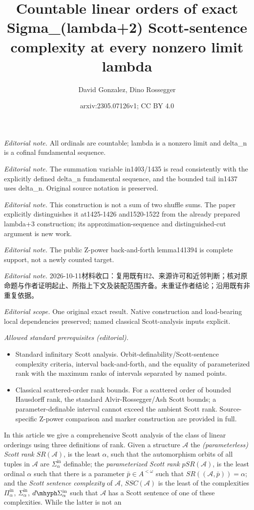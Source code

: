 \documentclass[10pt,a4paper]{amsart}
\title{Countable linear orders of exact Sigma\_(lambda+2) Scott-sentence complexity at every nonzero limit lambda}
\author{David Gonzalez, Dino Rossegger}
\date{arxiv:2305.07126v1; CC BY 4.0}
\providecommand{\A}{\mathcal{A}}
\providecommand{\Pinf}[1]{\Pi^{\mathrm{in}}_{#1}}
\providecommand{\Sinf}[1]{\Sigma^{\mathrm{in}}_{#1}}
\providecommand{\dSinf}[1]{d\mhyph\Sigma^{\mathrm{in}}_{#1}}
\providecommand{\bp}{\bar p}
\newcommand{\SR}{SR}
\newcommand{\pSR}{pSR}
\begin{document}
\maketitle
\noindent\textit{Editorial note.} All ordinals are countable; lambda is a nonzero limit and delta\_n is a cofinal fundamental sequence.\par\medskip
\noindent\textit{Editorial note.} The summation variable in1403/1435 is read consistently with the explicitly defined delta\_n fundamental sequence, and the bounded tail in1437 uses delta\_n. Original source notation is preserved.\par\medskip
\noindent\textit{Editorial note.} This construction is not a sum of two shuffle sums. The paper explicitly distinguishes it at1425-1426 and1520-1522 from the already prepared lambda+3 construction; its approximation-sequence and distinguished-cut argument is new work.\par\medskip
\noindent\textit{Editorial note.} The public Z-power back-and-forth lemma141394 is complete support, not a newly counted target.\par\medskip
\noindent\textit{Editorial note.} 2026-10-11材料收口：复用既有H2、来源许可和近邻判断；核对原命题与作者证明起止、所指上下文及装配范围齐备。未重证作者结论；沿用既有非重复依据。\par\medskip
\noindent\textit{Editorial scope.} One original exact result. Native construction and load-bearing local dependencies preserved; named classical Scott-analysis inputs explicit.\par\medskip
\noindent\textit{Allowed standard prerequisites (editorial).}\begin{itemize}
\item Standard infinitary Scott analysis. Orbit-definability/Scott-sentence complexity criteria, interval back-and-forth, and the equality of parameterized rank with the maximum ranks of intervals separated by named points.
\item Classical scattered-order rank bounds. For a scattered order of bounded Hausdorff rank, the standard Alvir-Rossegger/Ash Scott bounds; a parameter-definable interval cannot exceed the ambient Scott rank. Source-specific Z-power comparison and marker construction are provided in full.
\end{itemize}\medskip
In this article we give a comprehensive Scott analysis of the class of linear
orderings using three definitions of rank. Given a structure $\A$ the
\emph{(parameterless) Scott rank} $\SR(\A)$, is the least $\alpha$, such that
the automorphism orbits of all tuples in $\A$ are $\Sinf{\alpha}$ definable; the
\emph{parameterized Scott rank} $\pSR(\A)$, is the least ordinal $\alpha$ such
that there is a parameter $\bp\in A^{<\omega}$ such that $SR((\A,\bp))=\alpha$;
and the \emph{Scott sentence complexity} of $\A$, $SSC(\A)$ is the least of the
complexities $\Pinf{\alpha}$, $\Sinf{\alpha}$, $\dSinf{\alpha}$ such that $\A$
has a Scott sentence of one of these complexities. While the latter is not an
\end{document}
